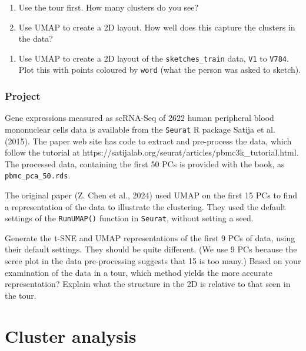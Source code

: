 \documentclass[
  letterpaper,
]{krantz}
\providecommand{\tightlist}{%
  \setlength{\itemsep}{0pt}\setlength{\parskip}{0pt}}\usepackage{longtable,booktabs,array}
\begin{document}
\begin{enumerate}
\def\labelenumi{\alph{enumi}.}
\item
  Use the tour first. How many clusters do you see?
\item
  Use UMAP to create a 2D layout. How well does this capture the
  clusters in the data?
\end{enumerate}

\begin{enumerate}
\def\labelenumi{\arabic{enumi}.}
\setcounter{enumi}{7}
\tightlist
\item
  Use UMAP to create a 2D layout of the \texttt{sketches\_train} data,
  \texttt{V1} to \texttt{V784}. Plot this with points coloured by
  \texttt{word} (what the person was asked to sketch).
\end{enumerate}

\section*{Project}\label{project-2}


Gene expressions measured as scRNA-Seq of 2622 human peripheral blood
mononuclear cells data is available from the \texttt{Seurat} R package
Satija et al. (2015). The paper web site has code to extract and
pre-process the data, which follow the tutorial at
https://satijalab.org/seurat/articles/pbmc3k\_tutorial.html. The
processed data, containing the first 50 PCs is provided with the book,
as \texttt{pbmc\_pca\_50.rds}.

The original paper (Z. Chen et al., 2024) used UMAP on the first 15 PCs
to find a representation of the data to illustrate the clustering. They
used the default settings of the \texttt{RunUMAP()} function in
\texttt{Seurat}, without setting a seed.

Generate the t-SNE and UMAP representations of the first 9 PCs of data,
using their default settings. They should be quite different. (We use 9
PCs because the scree plot in the data pre-processing suggests that 15
is too many.) Based on your examination of the data in a tour, which
method yields the more accurate representation? Explain what the
structure in the 2D is relative to that seen in the tour.

\part{Cluster analysis}
\end{document}

